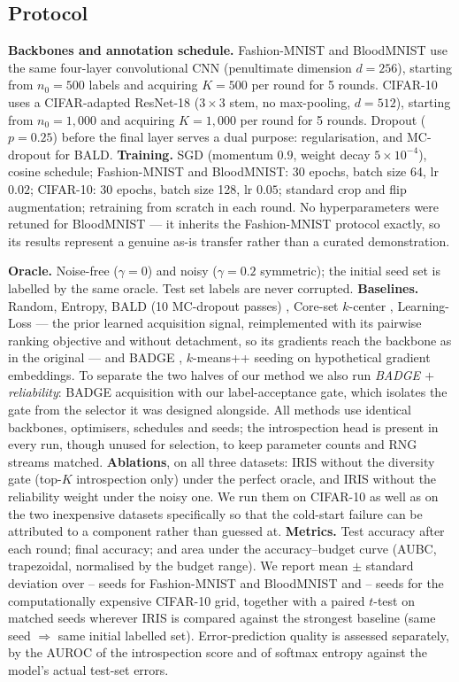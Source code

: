 \documentclass[a4paper,fleqn,longmktitle]{cas-sc}
\newcommand{\method}{IRIS}
\providecommand{\FmnistNoisyNSeeds}{--}\providecommand{\CifarNoisyNSeeds}{--}
\begin{document}
\subsection{Protocol}
\textbf{Backbones and annotation schedule.} Fashion-MNIST and
BloodMNIST use the same four-layer convolutional CNN (penultimate
dimension $d{=}256$), starting from $n_0{=}500$ labels and acquiring
$K{=}500$ per round for 5 rounds. CIFAR-10 uses a CIFAR-adapted
ResNet-18 ($3{\times}3$ stem, no max-pooling, $d{=}512$), starting from
$n_0{=}1{,}000$ and acquiring $K{=}1{,}000$ per round for 5 rounds.
Dropout ($p{=}0.25$) before the final layer serves a dual purpose:
regularisation, and MC-dropout for BALD. \textbf{Training.} SGD
(momentum $0.9$, weight decay $5\times10^{-4}$), cosine schedule;
Fashion-MNIST and BloodMNIST: 30 epochs, batch size 64, lr $0.02$;
CIFAR-10: 30 epochs, batch size 128, lr $0.05$; standard crop and flip
augmentation; retraining from scratch in each round. No hyperparameters
were retuned for BloodMNIST --- it inherits the Fashion-MNIST protocol
exactly, so its results represent a genuine as-is transfer rather than
a curated demonstration.

\textbf{Oracle.} Noise-free ($\gamma{=}0$) and noisy ($\gamma{=}0.2$
symmetric); the initial seed set is labelled by the same oracle. Test
set labels are never corrupted. \textbf{Baselines.} Random, Entropy,
BALD (10 MC-dropout passes) \citep{gal2017}, Core-set $k$-center
\citep{sener2018}, Learning-Loss \citep{yoo2019} --- the prior learned
acquisition signal, reimplemented with its pairwise ranking objective
and without detachment, so its gradients reach the backbone as in the
original --- and BADGE \citep{ash2020}, $k$-means++ seeding on
hypothetical gradient embeddings. To separate the two halves of our
method we also run \emph{BADGE $+$ reliability}: BADGE acquisition with
our label-acceptance gate, which isolates the gate from the selector it
was designed alongside. All methods use identical backbones, optimisers,
schedules and seeds; the introspection head is present in every run,
though unused for selection, to keep parameter counts and RNG streams
matched. \textbf{Ablations}, on all three datasets:
\method{} without the diversity gate (top-$K$ introspection only) under
the perfect oracle, and \method{} without the reliability weight under
the noisy one. We run them on CIFAR-10 as well as on the two
inexpensive datasets specifically so that the cold-start failure can be
attributed to a component rather than guessed at. \textbf{Metrics.} Test accuracy after each round; final
accuracy; and area under the accuracy--budget curve (AUBC,
trapezoidal, normalised by the budget range). We report mean $\pm$
standard deviation over \FmnistNoisyNSeeds{} seeds for Fashion-MNIST
and BloodMNIST and \CifarNoisyNSeeds{} seeds for the computationally
expensive CIFAR-10 grid, together with a paired $t$-test on matched
seeds wherever \method{} is compared against the strongest baseline
(same seed $\Rightarrow$ same initial labelled set). Error-prediction
quality is assessed separately, by the AUROC of the introspection score
and of softmax entropy against the model's actual test-set errors.
\end{document}
